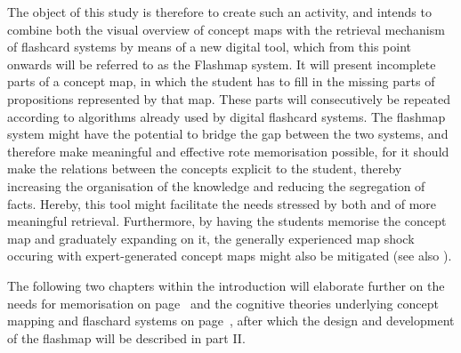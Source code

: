 The object of this study is therefore to create such an activity, and intends to combine both the visual overview of concept maps with the retrieval mechanism of flashcard systems by means of a new digital tool, which from this point onwards will be referred to as the Flashmap system. It will present incomplete parts of a concept map, in which the student has to fill in the missing parts of propositions represented by that map. These parts will consecutively be repeated according to algorithms already used by digital flashcard systems. The flashmap system might have the potential to bridge the gap between the two systems, and therefore make meaningful and effective rote memorisation possible, for it should make the relations between the concepts explicit to the student, thereby increasing the organisation of the knowledge and reducing the segregation of facts. Hereby, this tool might facilitate the needs stressed by both  and  of more meaningful retrieval. Furthermore, by having the students memorise the concept map and graduately expanding on it, the generally experienced map shock occuring with expert-generated concept maps might also be mitigated (see also ).

The following two chapters within the introduction will elaborate further on the needs for memorisation on page~\pageref{ch:context} and the cognitive theories underlying concept mapping and flaschard systems on page~\pageref{ch:theory}, after which the design and development of the flashmap will be described in part II.
